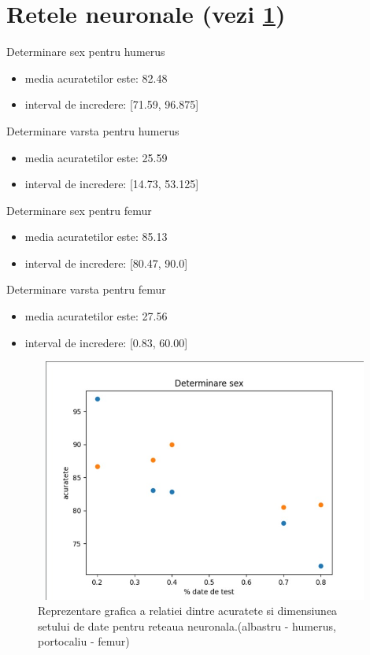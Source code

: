 \documentclass[runningheads,a4paper,11pt]{report}
\begin{document}
\section{Retele neuronale (vezi \ref{plot_retele})}
\label{analizaReteleSex}

\noindent Determinare sex pentru humerus
\begin{itemize}
    \item media acuratetilor este: 82.48
    \item interval de incredere: [71.59, 96.875]
\end{itemize}

\noindent Determinare varsta pentru humerus
\begin{itemize}
    \item media acuratetilor este: 25.59
    \item interval de incredere: [14.73, 53.125]
\end{itemize}

\noindent Determinare sex pentru femur
\begin{itemize}
    \item media acuratetilor este: 85.13
    \item interval de incredere: [80.47, 90.0]
\end{itemize}

\noindent Determinare varsta pentru femur
\begin{itemize}
    \item media acuratetilor este: 27.56
    \item interval de incredere: [0.83, 60.00]
\end{itemize}

\begin{figure}[!h]
    \centering
    \includegraphics[width=18cm,height=8cm]{Imagini/plot_acurateti_retea_sex.png}
    \caption{Reprezentare grafica a relatiei dintre acuratete si dimensiunea setului de date pentru reteaua neuronala.(albastru - humerus, portocaliu - femur)}
    \label{plot_retele}
\end{figure}
\end{document}

